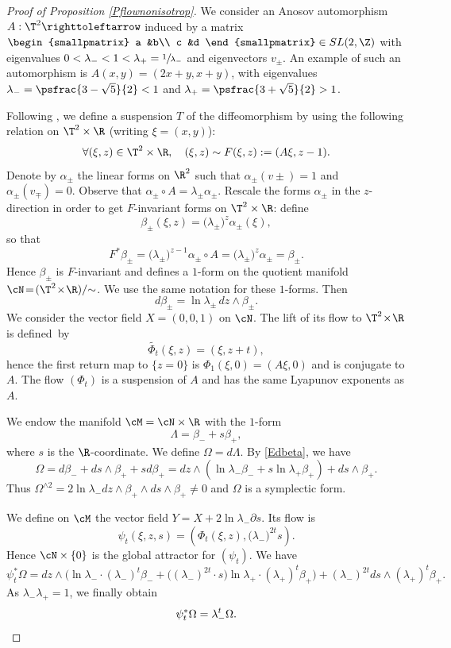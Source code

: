 \begin{proof}[Proof of Proposition \ref{Pflownonisotrop}]We consider an Anosov automorphism $A: \T^2\righttoleftarrow$ induced by a matrix $\begin{smallpmatrix}
a &b\\
c &d
\end{smallpmatrix} \in SL(2, \Z)$ with eigenvalues $0<\lambda_-< 1 < \lambda_+=\sfrac{1}{\lambda_-}$ and eigenvectors $v_\pm$. An example of such an automorphism is
$A(x,y)=(2x+y, x+y)$, with eigenvalues $\lambda_-=\psfrac{3-\sqrt{5}}{2}<1$ and
$\lambda_+=\psfrac{3+\sqrt{5}}{2}>1$.

Following \cite{ArnoldAvez1967}, we define a suspension $T$ of the diffeomorphism by using the following relation on $\T^2\times \R$ (writing $\xi=(x,y)$):
\[
\forall (\xi,z)\in\T^2\times \R,\quad (\xi,z)\sim F(\xi,z) := (A\xi, z-1).
\]
Denote by $\alpha_\pm$ the linear forms on $\R^2$ such that $\alpha_\pm(v\pm)=1$ and $\alpha_\pm(v_\mp)=0$. Observe that $\alpha_\pm\circ A=\lambda_\pm\alpha_\pm$. Rescale the forms $\alpha_\pm$ in the $z$-direction in order to get $F$\nobreakdash-in\-vari\-ant forms on $\T^2\times \R$: define
\[
\beta_\pm(\xi,z)=\big(\lambda_\pm\big)^z\alpha_\pm(\xi),
\]
so that
\[
F^*\beta_\pm=\big(\lambda_\pm\big)^{z-1}\alpha_\pm\circ A=\big(\lambda_\pm\big)^z\alpha_\pm=\beta_\pm.
\]
Hence $\beta_\pm$ is $F$-invariant and defines a $1$-form on
the quotient manifold \hbox{$\cN\!=\!(\T^2\!\times\!\R)/{\sim}$}. We use the same notation for these $1$-forms. Then
\begin{equation}\label{Edbeta}
d\beta_\pm=\ln\lambda_\pm \, dz\wedge\beta_\pm.
\end{equation}
We consider the vector field $X\!=\!(0, 0, 1)$ on $\cN$. The lift of its flow to $\T^2\!\times\! \R$ is defined~by
\[
\widetilde{\Phi_t}(\xi, z)=(\xi, z+t),
\]
hence the first return map to $\{z=0\}$ is $\Phi_1(\xi, 0)=(A\xi, 0)$ and is conjugate to $A$. The flow $(\Phi_t)$ is a suspension of $A$ and has the same Lyapunov exponents as $A$.

We endow the manifold $\cM=\cN\times\R$ with the $1$-form
\[
\Lambda=\beta_-+s\beta_+,
\]
where $s$ is the $\R$-coordinate. We define
$\Omega=d\Lambda$. By \eqref{Edbeta}, we have
\[
\Omega=d\beta_-+ds\wedge \beta_++sd\beta_+=dz\wedge (\ln\lambda_-\beta_-+s\ln\lambda_+\beta_+)+ds\wedge\beta_+.
\]
Thus $\Omega^{\wedge 2}= 2\ln\lambda_- dz\wedge \beta_+\wedge ds \wedge \beta_+\not=0$ and $\Omega$ is a symplectic form.

We define on $\cM$ the vector field $Y=X+2\ln \lambda_-\partial s$. Its flow is
\[
\psi_t(\xi, z, s)=(\Phi_t(\xi, z), \big(\lambda_-\big)^{2t}s).
\]
Hence $\cN\times \{ 0\}$ is the global attractor for $(\psi_t)$.
We have
\[
\psi_t^*\Omega=dz\wedge\Big(\ln\lambda_-\cdot(\lambda_-)^t\beta_-+\big((\lambda_-)^{2t}\cdot s\big)\ln\lambda_+\cdot(\lambda_+)^t\beta_+\Big)+(\lambda_-)^{2t}ds\wedge(\lambda_+)^t\beta_+.
\]
As $\lambda_-\lambda_+=1$, we finally obtain
\[
\psi_t^*\Omega=\lambda_-^t\Omega.\qedhere
\]
\end{proof}

